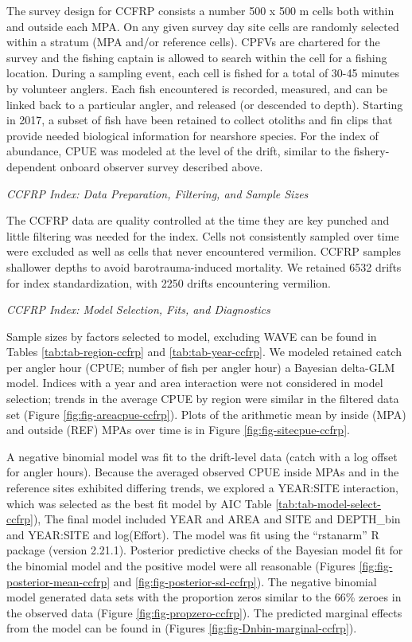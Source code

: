 \documentclass[
  english,
  a4paper,
]{article}
\begin{document}
The survey design for CCFRP consists a number 500 x 500 m cells both within and
outside each MPA. On any given survey day site cells are randomly
selected within a stratum (MPA and/or reference cells). CPFVs are chartered
for the survey and the fishing captain is allowed to search within the cell for
a fishing location. During a sampling event, each cell is fished for a total of
30-45 minutes by volunteer anglers. Each fish encountered is recorded, measured,
and can be linked back to a particular angler, and released (or descended to depth).
Starting in 2017, a subset of fish have been retained to collect otoliths and fin
clips that provide needed biological information for nearshore species. For the index of abundance, CPUE was modeled at the level of the drift, similar to the
fishery-dependent onboard observer survey described above.

\emph{CCFRP Index: Data Preparation, Filtering, and Sample Sizes}

The CCFRP data are quality controlled at the time they are key punched and little
filtering was needed for the index.
Cells not consistently sampled over time were excluded as well as cells that never encountered vermilion. CCFRP samples shallower
depths to avoid barotrauma-induced mortality. We retained 6532 drifts for index standardization, with 2250 drifts encountering vermilion.

\emph{CCFRP Index: Model Selection, Fits, and Diagnostics}

Sample sizes by factors selected to model, excluding WAVE can be found in Tables
\ref{tab:tab-region-ccfrp} and \ref{tab:tab-year-ccfrp}.
We modeled retained catch per angler hour (CPUE; number of fish per angler hour)
a Bayesian delta-GLM model. Indices with a year and area interaction were not
considered in model selection; trends in the average CPUE by region were similar
in the filtered data set (Figure \ref{fig:fig-areacpue-ccfrp}). Plots of the arithmetic
mean by inside (MPA) and outside (REF) MPAs over time is in Figure \ref{fig:fig-sitecpue-ccfrp}.

A negative binomial model was fit to the drift-level data (catch with a log offset for angler
hours). Because the averaged observed CPUE inside MPAs and in the reference sites exhibited
differing trends, we explored a YEAR:SITE interaction, which was selected as the best
fit model by AIC Table \ref{tab:tab-model-select-ccfrp}), The final model included
YEAR and AREA and SITE and DEPTH\_bin and YEAR:SITE and log(Effort).
The model was fit using the ``rstanarm'' R package (version 2.21.1). Posterior predictive
checks of the Bayesian model fit for the binomial model and the positive model
were all reasonable (Figures \ref{fig:fig-posterior-mean-ccfrp} and
\ref{fig:fig-posterior-sd-ccfrp}). The negative binomial model generated data sets with the
proportion zeros similar to the 66\% zeroes in the observed data
(Figure \ref{fig:fig-propzero-ccfrp}). The predicted marginal effects from the model can be found in (Figures \ref{fig:fig-Dnbin-marginal-ccfrp}).
\end{document}
